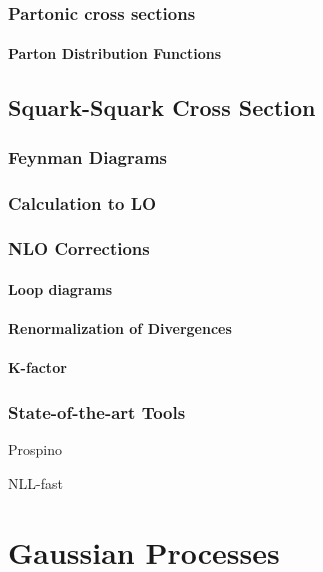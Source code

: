 \documentclass[twoside,english]{uiofysmaster}
\begin{document}
\subsection{Partonic cross sections}

\subsubsection{Parton Distribution Functions}

\section{Squark-Squark Cross Section}

\subsection{Feynman Diagrams}

\subsection{Calculation to LO}

\subsection{NLO Corrections}

\subsubsection{Loop diagrams}

\subsubsection{Renormalization of Divergences}

\subsubsection{K-factor}

\subsection{State-of-the-art Tools}

Prospino

NLL-fast


\chapter{Gaussian Processes}
\end{document}
